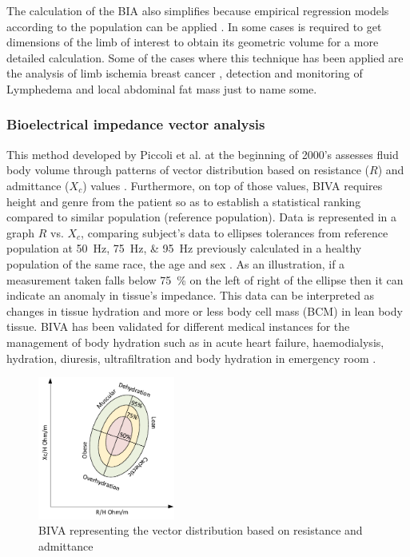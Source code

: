 The calculation of the BIA also simplifies because empirical regression models according to the population can be applied \cite{kyle2004bioelectrical}. In some cases is required to get dimensions of the limb of interest to obtain its geometric volume for a more detailed calculation.  Some of the cases where this technique has been applied are the analysis of limb ischemia \cite{songer2001tissue,kun1994tissue} breast cancer \cite{zou2003review}, detection and monitoring of Lymphedema \cite{vicini2012bioelectrical} and local abdominal fat mass \cite{scharfetter2001assessing} just to name some. 

\subsubsection{Bioelectrical impedance vector analysis}
This method developed by Piccoli et al. \cite{piccoli2000relationship, piccoli2002impedance} at the beginning of 2000’s assesses fluid body volume through patterns of vector distribution based on resistance ($R$) and admittance ($X_{c}$) values \cite{thomas2003comparison}. Furthermore, on top of those values, BIVA requires height and genre from the patient so as to establish a statistical ranking compared to similar population (reference population). Data is represented in a graph $R$ vs. $X_{c}$, comparing subject’s data to ellipses tolerances from reference population at \SIlist{50;75;95}{\hertz} previously calculated in a healthy population of the same race, the age and sex \cite{kyle2004bioelectrical,piccoli2000relationship, piccoli2002impedance}. As an illustration, if a measurement taken falls below \SI{75}{\percent} on the left of right of the ellipse then it can indicate an anomaly in tissue’s impedance. This data can be interpreted as changes in tissue hydration and more or less body cell mass (BCM) in lean body tissue. BIVA has been validated for different medical instances for the management of body hydration such as in acute heart failure, haemodialysis, hydration, diuresis, ultrafiltration and body hydration in emergency room \cite{disomma2011consensus}. 

\begin{figure}[!htpb]
	\centering
	\includegraphics[width=0.4\textwidth,keepaspectratio]{figure13}    
	\caption[BIVA representation]{BIVA representing the vector distribution based on resistance and admittance}
	\label{fig:BIVA plot}
\end{figure}


